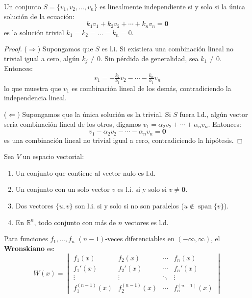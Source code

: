 \begin{theorem}
Un conjunto $S = \{v_1, v_2, \dots, v_n\}$ es linealmente independiente si y solo si la única solución de la ecuación:
$$k_1v_1 + k_2v_2 + \cdots + k_nv_n = \mathbf{0}$$
es la solución trivial $k_1 = k_2 = \dots = k_n = 0$.
\begin{proof}
($\Rightarrow$) Supongamos que $S$ es l.i. Si existiera una combinación lineal no trivial igual a cero, algún $k_j \neq 0$. Sin pérdida de generalidad, sea $k_1 \neq 0$. Entonces:
$$v_1 = -\tfrac{k_2}{k_1}v_2 - \cdots - \tfrac{k_n}{k_1}v_n$$
lo que muestra que $v_1$ es combinación lineal de los demás, contradiciendo la independencia lineal.

($\Leftarrow$) Supongamos que la única solución es la trivial. Si $S$ fuera l.d., algún vector sería combinación lineal de los otros, digamos $v_1 = \alpha_2v_2 + \cdots + \alpha_nv_n$. Entonces:
$$v_1 - \alpha_2v_2 - \cdots - \alpha_nv_n = \mathbf{0}$$
es una combinación lineal no trivial igual a cero, contradiciendo la hipótesis.
\end{proof}
\end{theorem}

\begin{coro}\label{coropropindlineal} Sea $V$ un espacio vectorial:
\begin{enumerate}[1.]
\item Un conjunto que contiene al vector nulo es l.d.
\item Un conjunto con un solo vector $v$ es l.i. si y solo si $v \neq \mathbf{0}$.
\item Dos vectores $\{u,v\}$ son l.i. si y solo si no son paralelos ($u \notin \operatorname{span}\{v\}$).
\item En $\mathbb{R}^n$, todo conjunto con más de $n$ vectores es l.d.
\end{enumerate}
\end{coro}

\begin{definition}[Wronskiano] 
Para funciones $f_1,\dots,f_n$ $(n-1)$-veces diferenciables en $(-\infty, \infty)$, el \textbf{Wronskiano} es:
$$W(x) = \begin{vmatrix} 
f_1(x) & f_2(x) & \cdots & f_n(x) \\
f_1'(x) & f_2'(x) & \cdots & f_n'(x) \\
\vdots & \vdots & \ddots & \vdots \\
f_1^{(n-1)}(x) & f_2^{(n-1)}(x) & \cdots & f_n^{(n-1)}(x) 
\end{vmatrix}$$
\end{definition}

